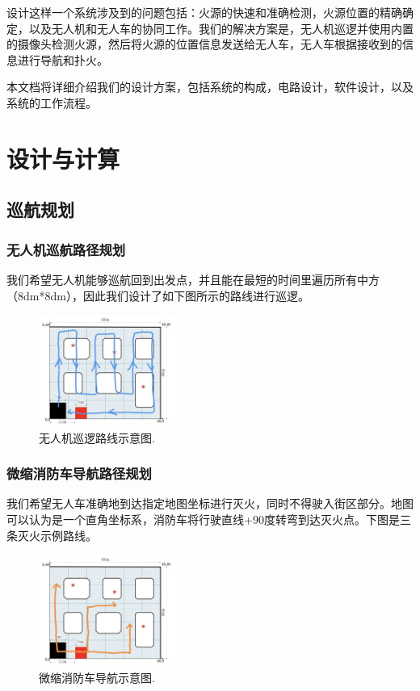 \documentclass[12pt, a4paper, oneside]{article}
\begin{document}
设计这样一个系统涉及到的问题包括：火源的快速和准确检测，火源位置的精确确定，以及无人机和无人车的协同工作。我们的解决方案是，无人机巡逻并使用内置的摄像头检测火源，然后将火源的位置信息发送给无人车，无人车根据接收到的信息进行导航和扑火。

本文档将详细介绍我们的设计方案，包括系统的构成，电路设计，软件设计，以及系统的工作流程。

\newpage

\section{设计与计算}

\subsection{巡航规划}

\subsubsection{无人机巡航路径规划}

我们希望无人机能够巡航回到出发点，并且能在最短的时间里遍历所有中方（8dm*8dm），因此我们设计了如下图所示的路线进行巡逻。

\begin{figure}[H]
    \centering
    \includegraphics[width=0.4\textwidth]{bff91c46fc5f6f6031116739473424e.jpg}
    \caption{无人机巡逻路线示意图.}
    \label{无人机巡逻路线示意图}
\end{figure}


\subsubsection{微缩消防车导航路径规划}

我们希望无人车准确地到达指定地图坐标进行灭火，同时不得驶入街区部分。地图可以认为是一个直角坐标系，消防车将行驶直线+90度转弯到达灭火点。下图是三条灭火示例路线。

\begin{figure}[H]
    \centering
    \includegraphics[width=0.4\textwidth]{6e7210d34c74a55112a223863fa78d1.jpg}
    \caption{微缩消防车导航示意图.}
    \label{微缩消防车导航示意图}
\end{figure}
\end{document}
